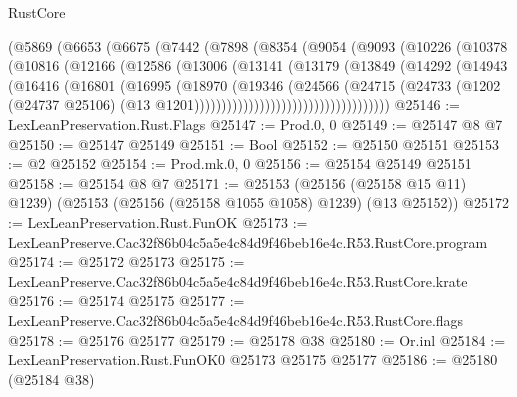 \begin{lexlean}{RustCore}
\begin{coremodule}
                  (@5869
                    (@6653
                      (@6675
                        (@7442
                          (@7898
                            (@8354
                              (@9054
                                (@9093
                                  (@10226
                                    (@10378
                                      (@10816
                                        (@12166
                                          (@12586
                                            (@13006
                                              (@13141
                                                (@13179
                                                  (@13849
                                                    (@14292
                                                      (@14943
                                                        (@16416
                                                          (@16801
                                                            (@16995
                                                              (@18970
                                                                (@19346
                                                                  (@24566
                                                                    (@24715
                                                                      (@24733
                                                                        (@1202
                                                                          (@24737 @25106)
                                                                          (@13
                                                                            @1201))))))))))))))))))))))))))))))))))))
@25146 := LexLeanPreservation.Rust.Flags
@25147 := Prod.{0, 0}
@25149 := @25147 @8 @7
@25150 := @25147 @25149
@25151 := Bool
@25152 := @25150 @25151
@25153 := @2 @25152
@25154 := Prod.mk.{0, 0}
@25156 := @25154 @25149 @25151
@25158 := @25154 @8 @7
@25171 := @25153
    (@25156 (@25158 @15 @11) @1239)
    (@25153 (@25156 (@25158 @1055 @1058) @1239) (@13 @25152))
@25172 := LexLeanPreservation.Rust.FunOK
@25173 := LexLeanPreserve.Cac32f86b04c5a5e4c84d9f46beb16e4c.R53.RustCore.program
@25174 := @25172 @25173
@25175 := LexLeanPreserve.Cac32f86b04c5a5e4c84d9f46beb16e4c.R53.RustCore.krate
@25176 := @25174 @25175
@25177 := LexLeanPreserve.Cac32f86b04c5a5e4c84d9f46beb16e4c.R53.RustCore.flags
@25178 := @25176 @25177
@25179 := @25178 @38
@25180 := Or.inl
@25184 := LexLeanPreservation.Rust.FunOK0 @25173 @25175 @25177
@25186 := @25180 (@25184 @38)

\end{coremodule}
\end{lexlean}
